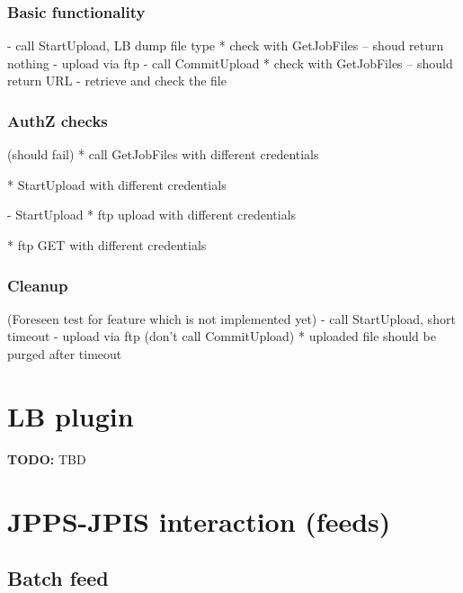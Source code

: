\documentclass{egee}
\def\todo#1{\textbf{TODO:} #1}
\begin{document}
\subsubsection{Basic functionality}
- call StartUpload, LB dump file type
* check with GetJobFiles -- shoud return nothing
- upload via ftp
- call CommitUpload
* check with GetJobFiles -- should return URL
- retrieve and check the file

\subsubsection{AuthZ checks}
(should fail)
* call GetJobFiles with different credentials

* StartUpload with different credentials

- StartUpload
* ftp upload with different credentials

* ftp GET with different credentials

\subsubsection{Cleanup}
(Foreseen test for feature which is not implemented yet)
- call StartUpload, short timeout
- upload via ftp
(don't call CommitUpload)
* uploaded file should be purged after timeout

\section{LB plugin}
\todo{TBD}

\section{JPPS-JPIS interaction (feeds)}





\subsection{Batch feed}
\end{document}

